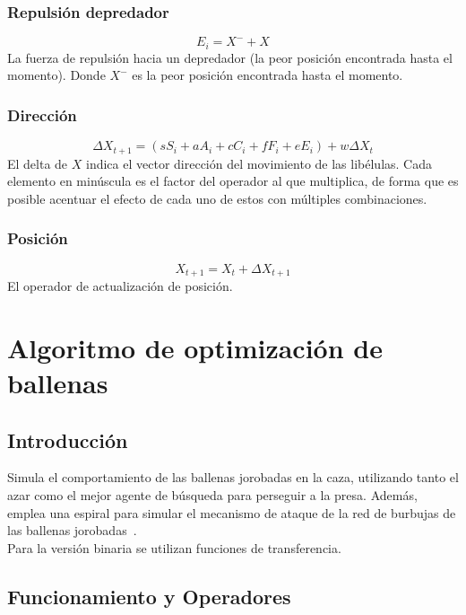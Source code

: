 \subsubsection{Repulsión depredador}
\begin{equation}
    E_i = X^- + X
\end{equation}
La fuerza de repulsión hacia un depredador (la peor posición encontrada hasta el momento). Donde $X^-$ es la peor posición encontrada hasta el momento.

\subsubsection{Dirección}
\begin{equation}
    \Delta X_{t+1} = (sS_i + aA_i + cC_i + fF_i + eE_i) + w\Delta X_t
\end{equation}
El delta de $X$ indica el vector dirección del movimiento de las libélulas. Cada elemento en minúscula es el factor del operador al que multiplica, de forma que es posible acentuar el efecto de cada uno de estos con múltiples combinaciones.

\subsubsection{Posición}
\begin{equation}
    X_{t+1} = X_{t} + \Delta X_{t+1}
\end{equation}
El operador de actualización de posición.

\section{Algoritmo de optimización de ballenas}
\subsection{Introducción}
Simula el comportamiento de las ballenas jorobadas en la caza, utilizando tanto el azar como el mejor agente de búsqueda para perseguir a la presa. Además, emplea una espiral para simular el mecanismo de ataque de la red de burbujas de las ballenas jorobadas~\cite{mirjalili_whale_2016}.\\[6pt]
Para la versión binaria se utilizan funciones de transferencia.

\subsection{Funcionamiento y Operadores}
